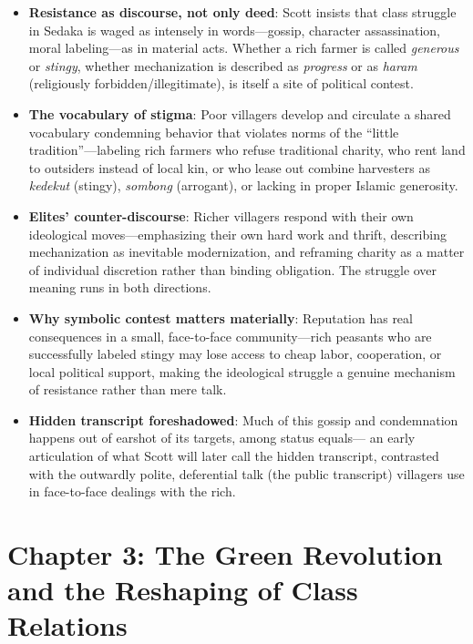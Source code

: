 \documentclass[12pt]{article}
\begin{document}
\begin{itemize}[leftmargin=*, itemsep=4pt]
    \item \textbf{Resistance as discourse, not only deed}: Scott insists that class struggle in Sedaka is waged as intensely in words---gossip, character assassination, moral labeling---as in material acts. Whether a rich farmer is called \emph{generous} or \emph{stingy}, whether mechanization is described as \emph{progress} or as \emph{haram} (religiously forbidden/illegitimate), is itself a site of political contest.
    \item \textbf{The vocabulary of stigma}: Poor villagers develop and circulate a shared vocabulary condemning behavior that violates norms of the ``little tradition''---labeling rich farmers who refuse traditional charity, who rent land to outsiders instead of local kin, or who lease out combine harvesters as \emph{kedekut} (stingy), \emph{sombong} (arrogant), or lacking in proper Islamic generosity.
    \item \textbf{Elites' counter-discourse}: Richer villagers respond with their own ideological moves---emphasizing their own hard work and thrift, describing mechanization as inevitable modernization, and reframing charity as a matter of individual discretion rather than binding obligation. The struggle over meaning runs in both directions.
    \item \textbf{Why symbolic contest matters materially}: Reputation has real consequences in a small, face-to-face community---rich peasants who are successfully labeled stingy may lose access to cheap labor, cooperation, or local political support, making the ideological struggle a genuine mechanism of resistance rather than mere talk.
    \item \textbf{Hidden transcript foreshadowed}: Much of this gossip and condemnation happens out of earshot of its targets, among status equals--- an early articulation of what Scott will later call the hidden transcript, contrasted with the outwardly polite, deferential talk (the public transcript) villagers use in face-to-face dealings with the rich.
\end{itemize}

\section{Chapter 3: The Green Revolution and the Reshaping of Class Relations}
\end{document}
